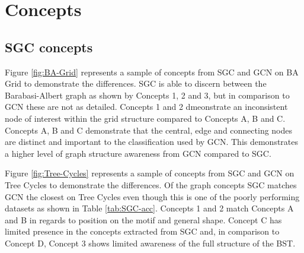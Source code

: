 \chapter{Concepts}
\label{app:concepts}

\section{SGC concepts}


Figure \ref{fig:BA-Grid} represents a sample of concepts from SGC and GCN on BA Grid to demonstrate the differences.
SGC is able to discern between the Barabasi-Albert graph as shown by Concepts 1, 2 and 3, but in comparison to GCN these are not as detailed.
Concepts 1 and 2 dmeonstrate an inconsistent node of interest within the grid structure compared to Concepts A, B and C.
Concepts A, B and C demonstrate that the central, edge and connecting nodes are distinct and important to the classification used by GCN.
This demonstrates a higher level of graph structure awareness from GCN compared to SGC.

Figure \ref{fig:Tree-Cycles} represents a sample of concepts from SGC and GCN on Tree Cycles to demonstrate the differences.
Of the graph concepts SGC matches GCN the closest on Tree Cycles even though this is one of the poorly performing datasets as shown in Table \ref{tab:SGC-acc}.
Concepts 1 and 2 match Concepts A and B in regards to position on the motif and general shape.
Concept C has limited presence in the concepts extracted from SGC and, in comparison to Concept D, Concept 3 shows limited awareness of the full structure of the BST.


